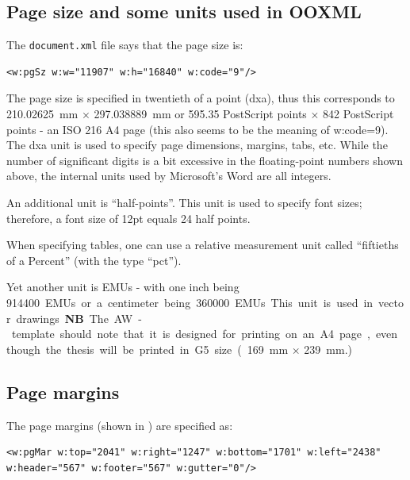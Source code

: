 \documentclass[12pt, twoside]{article}
\begin{document}
\subsection{Page size and some units used in OOXML}
The \texttt{document.xml} file says that the page size is:
\begin{lstlisting}[style=OOXML]
<w:pgSz w:w="11907" w:h="16840" w:code="9"/>
\end{lstlisting}

The page size is specified in twentieth of a point (\ie dxa), thus this
corresponds to \qty{210.02625}{\milli\metre} $\times$ \qty{297.038889}{\milli\metre} or 595.35 PostScript points $\times$ 842 PostScript points - \ie an ISO 216 A4 page (this also seems to be the meaning of w:code=9). The dxa unit is used to specify page dimensions, margins, tabs, etc. While the number of significant digits is a bit excessive in the floating-point numbers shown above, the internal units used by Microsoft's Word are all integers.

An additional unit is \enquote{half-points}. This unit is used to specify font sizes; therefore, a font size of 12pt equals 24 half points.

When specifying tables, one can use a relative measurement unit called \enquote{fiftieths of a Percent} (with the type \enquote{pct}).

Yet another unit is \glspl{EMU} - with one inch being \qty{914400} EMUs or a centimeter being \qty{360000} EMUs. This unit is used in vector drawings.

\textbf{NB} The AW-template should note that it is designed for printing on an A4 page, even though the thesis will be printed in G5 size (\qty{169}{\milli\metre} $\times$ \qty{239}{\milli\metre}.) 


\subsection{Page margins}
The page margins (shown in ) are specified as:
\begin{lstlisting}[style=OOXML]
<w:pgMar w:top="2041" w:right="1247" w:bottom="1701" w:left="2438" w:header="567" w:footer="567" w:gutter="0"/>
\end{lstlisting}
\end{document}
